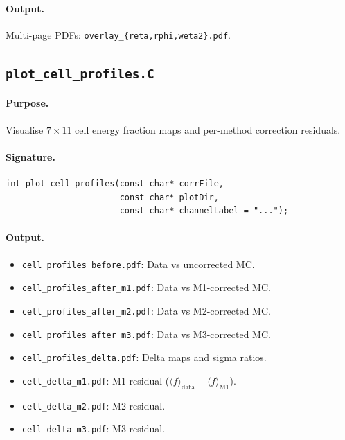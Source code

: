 \documentclass[12pt,a4paper]{article}
\begin{document}
\paragraph{Output.} Multi-page PDFs:
\texttt{overlay\_\{reta,rphi,weta2\}.pdf}.

\subsection{\texttt{plot\_cell\_profiles.C}}
\label{sec:scripts:cell_profiles}

\paragraph{Purpose.} Visualise $7\times11$ cell energy fraction maps and
per-method correction residuals.

\paragraph{Signature.}
\begin{lstlisting}[style=cppstyle]
int plot_cell_profiles(const char* corrFile,
                       const char* plotDir,
                       const char* channelLabel = "...");
\end{lstlisting}

\paragraph{Output.}
\begin{itemize}
  \item \texttt{cell\_profiles\_before.pdf}: Data vs uncorrected MC.
  \item \texttt{cell\_profiles\_after\_m1.pdf}: Data vs M1-corrected MC.
  \item \texttt{cell\_profiles\_after\_m2.pdf}: Data vs M2-corrected MC.
  \item \texttt{cell\_profiles\_after\_m3.pdf}: Data vs M3-corrected MC.
  \item \texttt{cell\_profiles\_delta.pdf}: Delta maps and sigma ratios.
  \item \texttt{cell\_delta\_m1.pdf}: M1 residual
    ($\langle f\rangle_\text{data} - \langle f\rangle_\text{M1}$).
  \item \texttt{cell\_delta\_m2.pdf}: M2 residual.
  \item \texttt{cell\_delta\_m3.pdf}: M3 residual.
\end{itemize}
\end{document}

